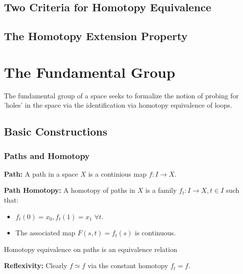 \documentclass[11pt, a4paper]{article}
\begin{document}
\subsection{Two Criteria for Homotopy Equivalence}

\subsection{The Homotopy Extension Property}

\section{The Fundamental Group}
The fundamental group of a space seeks to formalize the notion of probing for 'holes' in the space via the identification via homotopy equivalence of loops. 

\subsection{Basic Constructions}
\subsubsection{Paths and Homotopy}

\begin{definition}
  \textbf{Path: }A path in a space $X$ is a continious map $f: I\to X$.
\end{definition}

\begin{definition}
  \textbf{Path Homotopy: }A homotopy of paths in $X$ is a family $f_t: I\to X, t\in I$  such that:
  \begin{itemize}
    \item $f_t(0) = x_0, f_t(1) = x_1$ $\forall t$.
    \item The associated map $F(s,t) = f_t(s)$ is continuous. 
  \end{itemize}
\end{definition}

\begin{proposition}
  Homotopy equivalence on paths is an equivalence relation 
\end{proposition}
\proof 
\textbf{Reflexivity: }Clearly $f\simeq f$ via the constant homotopy $f_t = f$. 
\end{document}
